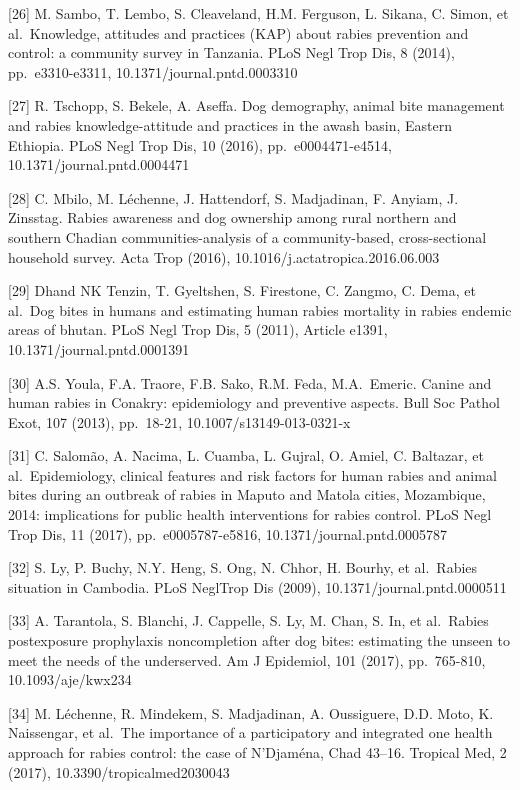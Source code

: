 \documentclass[
  oneside]{book}
\begin{document}
{[}26{]} M. Sambo, T. Lembo, S. Cleaveland, H.M. Ferguson, L. Sikana, C. Simon, et al.~Knowledge, attitudes and practices (KAP) about rabies prevention and control: a community survey in Tanzania. PLoS Negl Trop Dis, 8 (2014), pp.~e3310-e3311, 10.1371/journal.pntd.0003310

{[}27{]} R. Tschopp, S. Bekele, A. Aseffa. Dog demography, animal bite management and rabies knowledge-attitude and practices in the awash basin, Eastern Ethiopia. PLoS Negl Trop Dis, 10 (2016), pp.~e0004471-e4514, 10.1371/journal.pntd.0004471

{[}28{]} C. Mbilo, M. Léchenne, J. Hattendorf, S. Madjadinan, F. Anyiam, J. Zinsstag. Rabies awareness and dog ownership among rural northern and southern Chadian communities-analysis of a community-based, cross-sectional household survey. Acta Trop (2016), 10.1016/j.actatropica.2016.06.003

{[}29{]} Dhand NK Tenzin, T. Gyeltshen, S. Firestone, C. Zangmo, C. Dema, et al.~Dog bites in humans and estimating human rabies mortality in rabies endemic areas of bhutan. PLoS Negl Trop Dis, 5 (2011), Article e1391, 10.1371/journal.pntd.0001391

{[}30{]} A.S. Youla, F.A. Traore, F.B. Sako, R.M. Feda, M.A.~Emeric. Canine and human rabies in Conakry: epidemiology and preventive aspects. Bull Soc Pathol Exot, 107 (2013), pp.~18-21, 10.1007/s13149-013-0321-x

{[}31{]} C. Salomão, A. Nacima, L. Cuamba, L. Gujral, O. Amiel, C. Baltazar, et al.~Epidemiology, clinical features and risk factors for human rabies and animal bites during an outbreak of rabies in Maputo and Matola cities, Mozambique, 2014: implications for public health interventions for rabies control. PLoS Negl Trop Dis, 11 (2017), pp.~e0005787-e5816, 10.1371/journal.pntd.0005787

{[}32{]} S. Ly, P. Buchy, N.Y. Heng, S. Ong, N. Chhor, H. Bourhy, et al.~Rabies situation in Cambodia. PLoS NeglTrop Dis (2009), 10.1371/journal.pntd.0000511

{[}33{]} A. Tarantola, S. Blanchi, J. Cappelle, S. Ly, M. Chan, S. In, et al.~Rabies postexposure prophylaxis noncompletion after dog bites: estimating the unseen to meet the needs of the underserved. Am J Epidemiol, 101 (2017), pp.~765-810, 10.1093/aje/kwx234

{[}34{]} M. Léchenne, R. Mindekem, S. Madjadinan, A. Oussiguere, D.D. Moto, K. Naissengar, et al.~The importance of a participatory and integrated one health approach for rabies control: the case of N'Djaména, Chad 43--16. Tropical Med, 2 (2017), 10.3390/tropicalmed2030043
\end{document}

